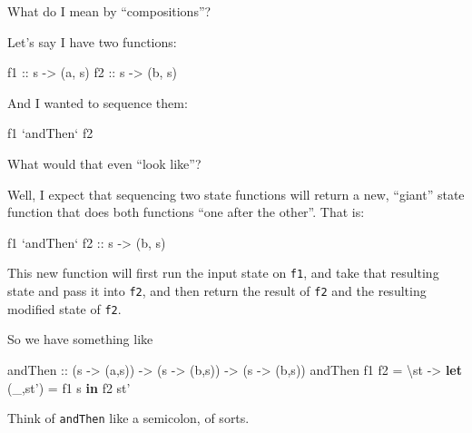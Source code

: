 \documentclass[]{article}
\newenvironment{Shaded}{}{}
\newcommand{\KeywordTok}[1]{\textcolor[rgb]{0.00,0.44,0.13}{\textbf{{#1}}}}
\newcommand{\OtherTok}[1]{\textcolor[rgb]{0.00,0.44,0.13}{{#1}}}
\newcommand{\FunctionTok}[1]{\textcolor[rgb]{0.02,0.16,0.49}{{#1}}}
\newcommand{\NormalTok}[1]{{#1}}
\begin{document}
What do I mean by ``compositions''?

Let's say I have two functions:

\begin{Shaded}
\begin{Highlighting}[]
\OtherTok{f1 ::} \NormalTok{s }\OtherTok{->} \NormalTok{(a, s)}
\OtherTok{f2 ::} \NormalTok{s }\OtherTok{->} \NormalTok{(b, s)}
\end{Highlighting}
\end{Shaded}

And I wanted to sequence them:

\begin{Shaded}
\begin{Highlighting}[]
\NormalTok{f1 }\OtherTok{`andThen`} \NormalTok{f2}
\end{Highlighting}
\end{Shaded}

What would that even ``look like''?

Well, I expect that sequencing two state functions will return a new,
``giant'' state function that does both functions ``one after the
other''. That is:

\begin{Shaded}
\begin{Highlighting}[]
\NormalTok{f1 }\OtherTok{`andThen` f2 ::} \NormalTok{s }\OtherTok{->} \NormalTok{(b, s)}
\end{Highlighting}
\end{Shaded}

This new function will first run the input state on \texttt{f1}, and
take that resulting state and pass it into \texttt{f2}, and then return
the result of \texttt{f2} and the resulting modified state of
\texttt{f2}.

So we have something like

\begin{Shaded}
\begin{Highlighting}[]
\OtherTok{andThen ::} \NormalTok{(s }\OtherTok{->} \NormalTok{(a,s)) }\OtherTok{->} \NormalTok{(s }\OtherTok{->} \NormalTok{(b,s)) }\OtherTok{->} \NormalTok{(s }\OtherTok{->} \NormalTok{(b,s))}
\NormalTok{andThen f1 f2 }\FunctionTok{=} \NormalTok{\textbackslash{}st }\OtherTok{->} \KeywordTok{let} \NormalTok{(_,st') }\FunctionTok{=} \NormalTok{f1 s}
                       \KeywordTok{in}  \NormalTok{f2 st'}
\end{Highlighting}
\end{Shaded}

Think of \texttt{andThen} like a semicolon, of sorts.
\end{document}
